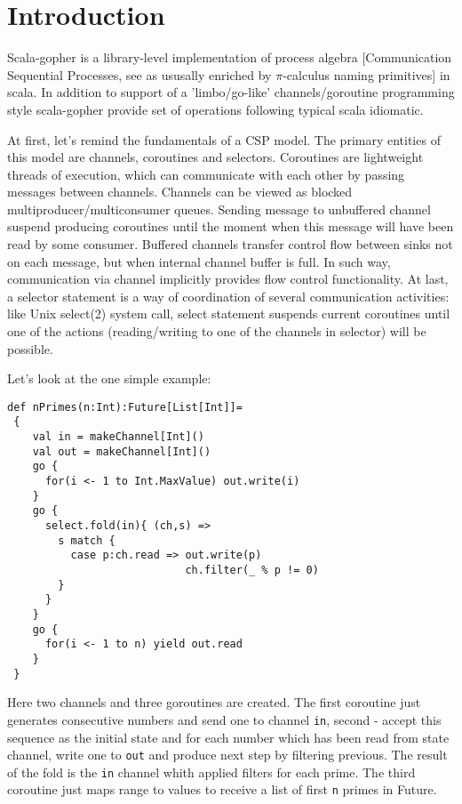 \documentclass[12pt]{article}
\begin{document}
\maketitle


\section{Introduction}

 Scala-gopher is a library-level implementation of process algebra [Communication Sequential Processes, see \cite{Hoare85communicatingsequential} as ususally enriched by $\pi$-calculus \cite{Milner:1992:CMP:162037.162038} naming primitives] in scala. In addition to support of a 'limbo/go-like' \cite{Inferno:Limbo}  \cite{golang} channels/goroutine programming style scala-gopher provide set of operations following typical scala idiomatic. 

    At first, let's remind the fundamentals of a CSP model. The primary entities of this model are channels, coroutines and selectors. Coroutines are lightweight threads of execution, which can communicate with each other by passing messages between channels. Channels can be viewed as blocked multiproducer/multiconsumer queues. Sending message to unbuffered channel suspend producing coroutines until the moment when this message will have been read by some consumer. Buffered channels transfer control flow between sinks not on each message, but when internal channel buffer is full.  
In such way, communication via channel implicitly provides flow control functionality.  At last, a selector statement is a way of coordination of several communication activities: like Unix select(2) system call, select statement suspends current coroutines until one of the actions (reading/writing to one of the channels in selector) will be possible.

   Let's look at the one simple example:
\begin{Verbatim}[fontsize=\small]
 def nPrimes(n:Int):Future[List[Int]]=
 {
    val in = makeChannel[Int]()
    val out = makeChannel[Int]()
    go {
      for(i <- 1 to Int.MaxValue) out.write(i)
    }
    go {
      select.fold(in){ (ch,s) =>
        s match {
          case p:ch.read => out.write(p)
                            ch.filter(_ % p != 0)
        }
      }
    }
    go {
      for(i <- 1 to n) yield out.read
    }
 }
\end{Verbatim}
  Here two channels and three goroutines are created.  The first coroutine just generates consecutive numbers and send one to channel \verb|in|, second - accept this sequence as the initial state and for each number which has been read from state channel, write one to \verb|out| and produce next step by filtering previous. The result of the fold is the \verb|in| channel whith applied filters for each prime. The third coroutine just maps range to values to receive a list of first \verb|n| primes in Future.
\end{document}

